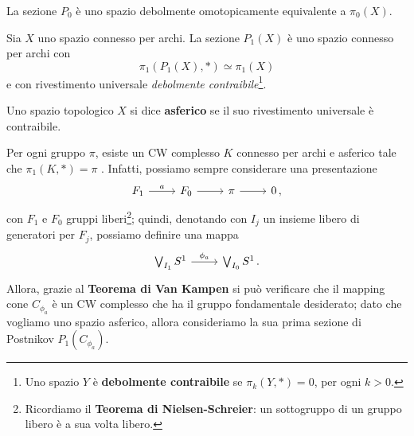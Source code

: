 


\begin{ex}
	La sezione $P_{0}$ è uno spazio debolmente omotopicamente
	equivalente a $\pi_{0}(X)$.
\end{ex}

\begin{ex}
	Sia $X$ uno spazio connesso per archi.
	La sezione $P_{1}(X)$ è uno spazio connesso per archi con
	\begin{equation*}
		\pi_{1}(P_{1}(X),\ast) \simeq \pi_{1}(X)
	\end{equation*}
	e con rivestimento universale \emph{debolmente contraibile}\footnote{Uno spazio $Y$ è \textbf{debolmente contraibile} se $\pi_{k}(Y,\ast) = 0$, per ogni $k>0$.}.
\end{ex}

\begin{df}
	Uno spazio topologico $X$
	si dice \textbf{asferico} se il suo 
	rivestimento universale è contraibile.
\end{df}

\begin{oss}
	Per ogni gruppo $\pi$,
	esiste un CW complesso $K$ connesso per archi e asferico
	tale che $\pi_{1}(K,\ast) = \pi$ .
	Infatti, possiamo sempre considerare una presentazione
	\begin{equation*}
		\begin{tikzcd}
			F_{1} \ar[r, "a"] & F_{0} \ar[r] & \pi \ar[r] & 0\,, 
		\end{tikzcd}
	\end{equation*}
	con $F_{1}$ e $F_{0}$ gruppi liberi\footnote{Ricordiamo il \textbf{Teorema di Nielsen-Schreier}: un sottogruppo di un gruppo libero è a sua volta libero.};
	quindi, denotando con $I_{j}$ un insieme libero di generatori per $F_{j}$,
	possiamo definire una mappa
	\begin{equation*}
		\begin{tikzcd}
			\bigvee_{I_{1}} S^{1} \ar[r, "\phi_{a}"] & \bigvee_{I_{0}} S^{1}\,.
		\end{tikzcd}
	\end{equation*}
	Allora, grazie al \textbf{Teorema di Van Kampen} si può verificare
	che il mapping cone $C_{\phi_{a}}$ è un CW complesso
	che ha il gruppo fondamentale desiderato;
	dato che vogliamo uno spazio asferico, allora consideriamo
	la sua prima sezione di Postnikov
	$P_{1}\left(C_{\phi_{a}}\right)$.
\end{oss}

